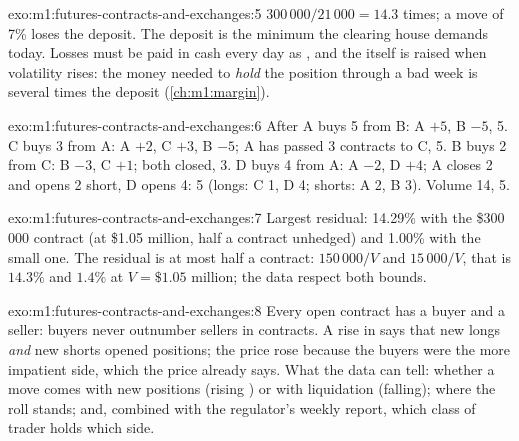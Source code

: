 \begin{solution}{exo:m1:futures-contracts-and-exchanges:5}
$300\,000/21\,000 = 14.3$ times; a move of 7\% loses the deposit. The deposit
is the minimum the clearing house demands today. Losses must be paid in cash
every day as , and the  itself is raised when
volatility rises: the money needed to \emph{hold} the position through a bad
week is several times the deposit (\cref{ch:m1:margin}).
\end{solution}

\begin{solution}{exo:m1:futures-contracts-and-exchanges:6}
After A buys 5 from B: A $+5$, B $-5$,  5. C buys 3 from A: A
$+2$, C $+3$, B $-5$; A has passed 3 contracts to C,  5. B buys
2 from C: B $-3$, C $+1$; both closed,  3. D buys 4 from A: A
$-2$, D $+4$; A closes 2 and opens 2 short, D opens 4:  5
(longs: C 1, D 4; shorts: A 2, B 3). Volume 14,  5.
\end{solution}

\begin{solution}{exo:m1:futures-contracts-and-exchanges:7}
Largest residual: 14.29\% with the \$300\,000 contract (at \$1.05 million,
half a contract unhedged) and 1.00\% with the small one. The residual is at
most half a contract: $150\,000/V$ and $15\,000/V$, that is $14.3\%$ and
$1.4\%$ at $V = \$1.05$ million; the data respect both bounds.
\end{solution}

\begin{solution}{exo:m1:futures-contracts-and-exchanges:8}
Every open contract has a buyer and a seller: buyers never outnumber sellers
in contracts. A rise in  says that new longs \emph{and} new
shorts opened positions; the price rose because the buyers were the more
impatient side, which the price already says. What the data can tell:
whether a move comes with new positions (rising ) or with
liquidation (falling); where the roll stands; and, combined with the
regulator's weekly report, which class of trader holds which side.
\end{solution}


